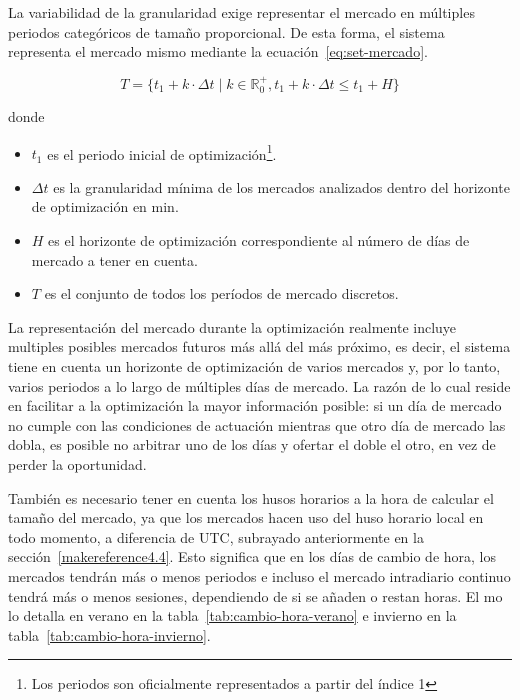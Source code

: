 La variabilidad de la granularidad exige representar el mercado en múltiples periodos categóricos de tamaño proporcional. De esta forma, el sistema representa el mercado mismo mediante la ecuación~\ref{eq:set-mercado}.

\begin{samepage}

  \begin{equation}%
    \label{eq:set-mercado}
    T = \{t_{1} + k \cdot \Delta t \mid k \in \mathbb{R}^{+}_{0}, t_{1} + k \cdot \Delta t \leq t_{1} + H\}
  \end{equation}

  donde

  \begin{itemize}

    \item \( t_{1} \) es el periodo inicial de optimización\footnote{Los periodos son oficialmente representados a partir del índice 1}.

    \item \( \Delta t \) es la granularidad mínima de los mercados analizados dentro del horizonte de optimización en \si{\minute}.

    \item \( H \) es el horizonte de optimización correspondiente al número de días de mercado a tener en cuenta.

    \item \( T \) es el conjunto de todos los períodos de mercado discretos.

  \end{itemize}

\end{samepage}

La representación del mercado durante la optimización realmente incluye multiples posibles mercados futuros más allá del más próximo, es decir, el sistema tiene en cuenta un horizonte de optimización de varios mercados y, por lo tanto, varios periodos a lo largo de múltiples días de mercado. La razón de lo cual reside en facilitar a la optimización la mayor información posible: si un día de mercado no cumple con las condiciones de actuación mientras que otro día de mercado las dobla, es posible no arbitrar uno de los días y ofertar el doble el otro, en vez de perder la oportunidad.

También es necesario tener en cuenta los husos horarios a la hora de calcular el tamaño del mercado, ya que los mercados hacen uso del huso horario local en todo momento, a diferencia de UTC, subrayado anteriormente en la sección~\ref{makereference4.4}. Esto significa que en los días de cambio de hora, los mercados  tendrán más o menos periodos e incluso el mercado intradiario continuo tendrá más o menos sesiones, dependiendo de si se añaden o restan horas. El \gls{mo} lo detalla en verano en la tabla~\ref{tab:cambio-hora-verano} e invierno en la tabla~\ref{tab:cambio-hora-invierno}.

